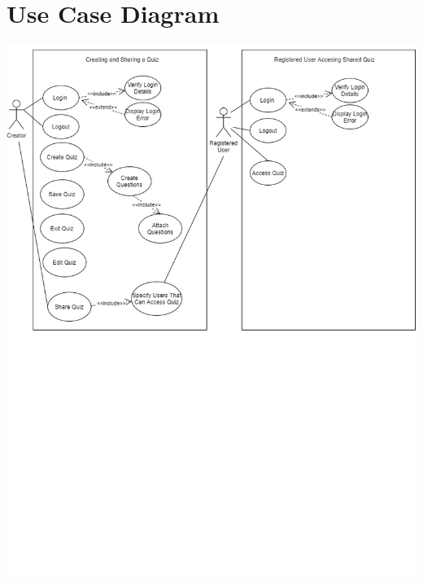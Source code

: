 \documentclass[a4paper]{article}
\begin{document}
	\section{Use Case Diagram}
	\includegraphics[scale=0.55]{Login_Create_Quiz_Use_Case_Diagram}

	\newpage
\end{document}
